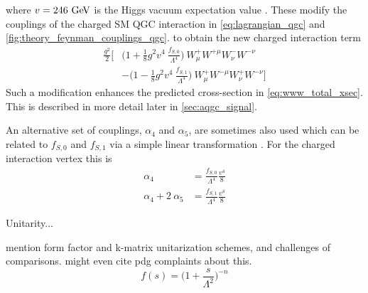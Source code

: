 where $v = 246 \GeV$ is the Higgs vacuum expectation value \cite{PDG:2014}.
These modify the couplings of 
the charged SM QGC interaction in \eqn\eqref{eq:lagrangian_qgc}
and \fig\ref{fig:theory_feynman_couplings_qgc}. 
to obtain the new charged interaction term
\begin{equation}
\begin{aligned}
\frac{g^2}{2}\Bigg[&\Big(1 +  \frac{1}{8} g^2 v^4~ \frac{f_{S,0}}{\Lambda^4} \Big) ~W_{\mu}^+ W^{+\mu} W_{\nu}^- W^{-\nu} \\&- \Big( 1 - \frac{1}{8} g^2 v^4~\frac{f_{S,1}}{\Lambda^4}\Big) ~W_{\mu}^+ W^{-\mu} W_{\nu}^+W^{-\nu}\Bigg] 
\end{aligned}
\end{equation}
Such a modification enhances the predicted 
cross-section in \eqn\eqref{eq:www_total_xsec}. This is described in more
detail later in \sec\ref{sec:aqgc_signal}.

An alternative set of couplings, $\alpha_4$ and $\alpha_5$, are sometimes also used
which can be related to $f_{S,0}$ and $f_{S,1}$ via a simple linear transformation \cite{Baak:2013fwa}. 
For the charged interaction vertex this is 
\begin{equation}
\begin{aligned}
\alpha_4 &= \frac{f_{S,0}}{\Lambda^4} \frac{v^4}{8} \\
\alpha_4 + 2~\alpha_5 &= \frac{f_{S,1}}{\Lambda^4} \frac{v^4}{8}
\end{aligned}
\label{eq:alpha45}
\end{equation}



Unitarity...

mention form factor and k-matrix unitarization schemes, and 
challenges of comparisons. might even cite pdg complaints about 
this.
%
\begin{equation}
f(s) = \Big( 1 + \frac{s}{\Lambda^2} \Big)^{-n}
\label{eq:form_factor}
\end{equation}



